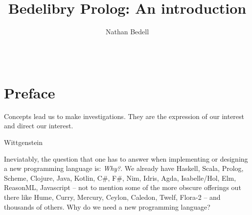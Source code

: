 \documentclass{book}
\author{Nathan Bedell}
\title{Bedelibry Prolog: An introduction}
\newenvironment{dedication}
{\clearpage           %
	\thispagestyle{empty}%
	\vspace*{\stretch{1}}%
	\itshape             %
	\raggedleft          %
}
{\par %
	\vspace{\stretch{3}} %
	\clearpage           %
}
\begin{document}
\maketitle

\pagebreak
{}
\begin{center}
	$\;$ \\ $\;$ \\ $\;$ \\ $\;$ \\
  	$\;$ \\ $\;$ \\ $\;$ \\ $\;$ \\
	$\;$ \\ $\;$ \\ $\;$ \\ $\;$ \\
  	$\;$ \\ $\;$ \\ $\;$ \\ $\;$ \\ $\;$ \\ $\;$ \\
	\doclicenseThis
\end{center}


\chapter*{Preface}

\epigraph{Concepts lead us to make investigations. They are the expression of our interest and direct our interest.}{Wittgenstein}

Ineviatably, the question that one has to answer when implementing or designing a new programming language is: \textit{Why?}. We already have Haskell, Scala, Prolog, Scheme, Clojure, Java, Kotlin, C\#, F\#, Nim, Idris, Agda, Isabelle/Hol, Elm, ReasonML, Javascript -- not to mention some of the more obscure offerings out there like Hume, Curry, Mercury, Ceylon, Caledon, Twelf, Flora-2 -- and thousands of others. Why do we need a new programming language?
\end{document}
